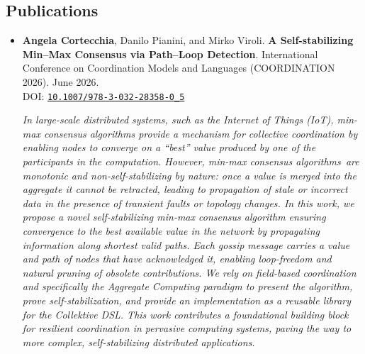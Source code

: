 \documentclass[11pt]{scrartcl}
\newcommand{\pubentry}[6]{%
  \item
  #1.
  \textbf{#2}.
  #3.
  #4.
  \if\relax\detokenize{#6}\relax\else
    \\ DOI: \href{https://doi.org/#6}{\texttt{#6}}%
  \fi

  \begin{sloppypar}
    \vspace{8pt}
    \textit{#5}
    \vspace{8pt}
  \end{sloppypar}
}
\newenvironment{publications}
  {%
    \subsection*{Publications}
    \begin{itemize}
  }
  {%
    \end{itemize}
  }
\begin{document}
\begin{publications}

  \pubentry
  {\textbf{Angela Cortecchia}, Danilo Pianini, and Mirko Viroli}
  {A Self-stabilizing Min--Max Consensus via Path--Loop Detection}
  {International Conference on Coordination Models and Languages (COORDINATION 2026)}
  {June 2026}
  {In large-scale distributed systems, such as the Internet of Things (IoT), min-max consensus algorithms provide a mechanism for collective coordination by enabling nodes to converge on a “best” value produced by one of the participants in the computation. However, min-max consensus algorithms are monotonic and non-self-stabilizing by nature: once a value is merged into the aggregate it cannot be retracted, leading to propagation of stale or incorrect data in the presence of transient faults or topology changes. In this work, we propose a novel self-stabilizing min-max consensus algorithm ensuring convergence to the best available value in the network by propagating information along shortest valid paths. Each gossip message carries a value and path of nodes that have acknowledged it, enabling loop-freedom and natural pruning of obsolete contributions. We rely on field-based coordination and specifically the Aggregate Computing paradigm to present the algorithm, prove self-stabilization, and provide an implementation as a reusable library for the \textit{Collektive} DSL. This work contributes a foundational building block for resilient coordination in pervasive computing systems, paving the way to more complex, self-stabilizing distributed applications.}
  {10.1007/978-3-032-28358-0\_5}



\end{publications}
\end{document}
